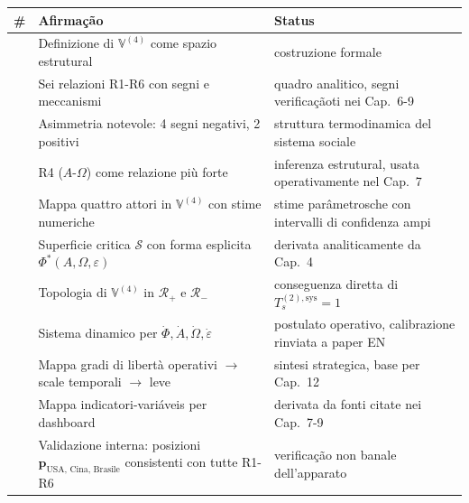 {\def\LTcaptype{none} %
{\small\begin{longtable}[]{@{}
  >{\raggedright\arraybackslash}p{}
  >{\raggedright\arraybackslash}p{}
  >{\raggedright\arraybackslash}p{}@{}}
\toprule\noalign{}
\begin{minipage}[b]{\linewidth}\raggedright
\#
\end{minipage} & \begin{minipage}[b]{\linewidth}\raggedright
Afirmação
\end{minipage} & \begin{minipage}[b]{\linewidth}\raggedright
Status
\end{minipage} \\
\midrule\noalign{}
\endhead
\bottomrule\noalign{}
\endlastfoot
1 & Definizione di \(\mathbb{V}^{(4)}\) come spazio estrutural &
\Hypoth{} costruzione formale \\
2 & Sei relazioni R1-R6 con segni e meccanismi & \Hypoth{} quadro
analitico, segni verificaçãoti nei Cap.~6-9 \\
3 & Asimmetria notevole: 4 segni negativi, 2 positivi & \Proved{}
struttura termodinamica del sistema sociale \\
4 & R4 (\(A\)-\(\Omega\)) come relazione più forte & \Hypoth{} inferenza
estrutural, usata operativamente nel Cap.~7 \\
5 & Mappa quattro attori in \(\mathbb{V}^{(4)}\) con stime numeriche &
\Conj{} stime parâmetrosche con intervalli di confidenza ampi \\
6 & Superficie critica \(\mathcal{S}\) con forma esplicita
\(\Phi^*(A, \Omega, \varepsilon)\) & \Proved{} derivata analiticamente
da Cap.~4 \\
7 & Topologia di \(\mathbb{V}^{(4)}\) in \(\mathcal{R}_+\) e
\(\mathcal{R}_-\) & \Proved{} conseguenza diretta di
\(T_s^{(2),\text{sys}} = 1\) \\
8 & Sistema dinamico per
\(\dot\Phi, \dot A, \dot\Omega, \dot\varepsilon\) & \Hypoth{} postulato
operativo, calibrazione rinviata a paper EN \\
9 & Mappa gradi di libertà operativi \(\to\) scale temporali \(\to\)
leve & \Hypoth{} sintesi strategica, base per Cap.~12 \\
10 & Mappa indicatori-variáveis per dashboard & \Proved{} derivata da
fonti citate nei Cap.~7-9 \\
11 & Validazione interna: posizioni
\(\boldsymbol{p}_{\text{USA, Cina, Brasile}}\) consistenti con tutte
R1-R6 & \Proved{} verificação non banale dell'apparato \\
\end{longtable}}
}



